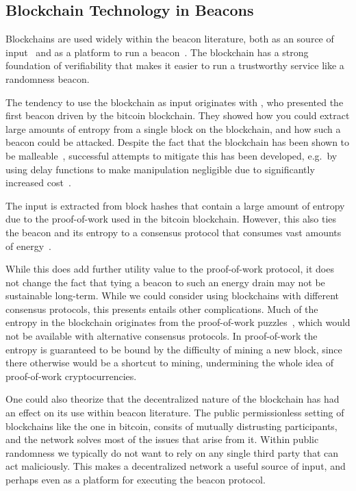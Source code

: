 \subsection{Blockchain Technology in Beacons}

Blockchains are used widely within the beacon literature, both as an source of input~\cite{bonneau2015bitcoin, bentov2016bitcoin, bunz2017proofsof} and as a platform to run a beacon~\cite{randao, bunz2017proofsof}.
The blockchain has a strong foundation of verifiability that makes it easier to run a trustworthy service like a randomness beacon.

The tendency to use the blockchain as input originates with \citet{bonneau2015bitcoin}, who presented the first beacon driven by the bitcoin blockchain.
They showed how you could extract large amounts of entropy from a single block on the blockchain, and how such a beacon could be attacked.
Despite the fact that the blockchain has been shown to be malleable~\cite{pierrot2016malleability}, successful attempts to mitigate this has been developed, e.g.\ by using delay functions to make manipulation negligible due to significantly increased cost~\cite{bunz2017proofsof}.

The input is extracted from block hashes that contain a large amount of entropy due to the proof-of-work used in the bitcoin blockchain.
However, this also ties the beacon and its entropy to a consensus protocol that consumes vast amounts of energy~\cite{bitcoinenergy}.

While this does add further utility value to the proof-of-work protocol, it does not change the fact that tying a beacon to such an energy drain may not be sustainable long-term.
While we could consider using blockchains with different consensus protocols, this presents entails other complications.
Much of the entropy in the blockchain originates from the proof-of-work puzzles~\cite{bonneau2015bitcoin}, which would not be available with alternative consensus protocols.
In proof-of-work the entropy is guaranteed to be bound by the difficulty of mining a new block, since there otherwise would be a shortcut to mining, undermining the whole idea of proof-of-work cryptocurrencies.

One could also theorize that the decentralized nature of the blockchain has had an effect on its use within beacon literature.
The public permissionless setting of blockchains like the one in bitcoin, consits of mutually distrusting participants, and the network solves most of the issues that arise from it.
Within public randomness we typically do not want to rely on any single third party that can act maliciously. This makes a decentralized network a useful source of input, and perhaps even as a platform for executing the beacon protocol.

